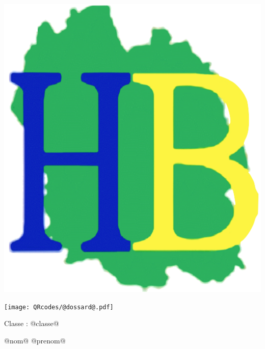 \Huge

\begin{block} %
{}\hfill {}
{}\hfill {}
\begin{minipage}{0.15\linewidth}
\includegraphics[width=\textwidth]{logo-HB.png}
\end{minipage}
{}\hfill {}



\begin{minipage}{0.48\linewidth}
\texttt{[image: QRcodes/@dossard@.pdf]}
\end{minipage}
\begin{minipage}{0.5\linewidth}
{}\hfill {}
{}\hfill {}
\end{minipage}


\vspace{0.5cm}
\begin{minipage}{0.47\linewidth}
Classe : @classe@
\end{minipage}
\hfill {}
\begin{minipage}{0.5\linewidth}
@nom@ @prenom@
\end{minipage}
\hfill {}

\end{block}

\vfill


\vfill

